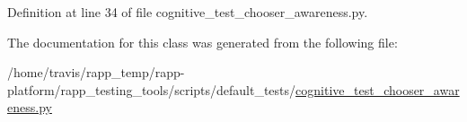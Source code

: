 Definition at line 34 of file cognitive\-\_\-test\-\_\-chooser\-\_\-awareness.\-py.



The documentation for this class was generated from the following file\-:\begin{DoxyCompactItemize}
\item 
/home/travis/rapp\-\_\-temp/rapp-\/platform/rapp\-\_\-testing\-\_\-tools/scripts/default\-\_\-tests/\hyperlink{cognitive__test__chooser__awareness_8py}{cognitive\-\_\-test\-\_\-chooser\-\_\-awareness.\-py}\end{DoxyCompactItemize}
